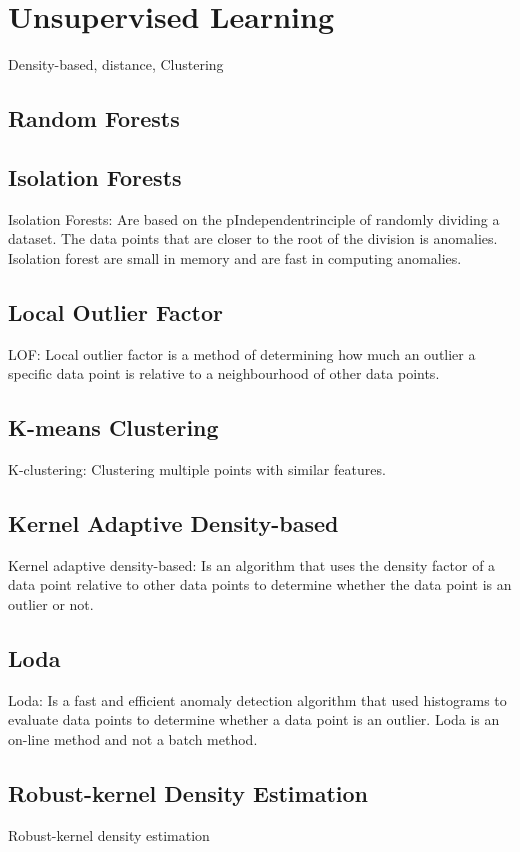 \section{Unsupervised Learning}
Density-based, distance, Clustering

\subsection{Random Forests}

\subsection{Isolation Forests}
Isolation Forests: Are based on the pIndependentrinciple of randomly dividing a dataset. The data points that are closer to the root of the division is anomalies. Isolation forest are small in memory and are fast in computing anomalies.

\subsection{Local Outlier Factor}
LOF: Local outlier factor is a method of determining how much an outlier a specific data point is relative to a neighbourhood of other data points.

\subsection{K-means Clustering}
K-clustering: Clustering multiple points with similar features.

\subsection{Kernel Adaptive Density-based}
Kernel adaptive density-based: Is an algorithm that uses the density factor of a data point relative to other data points to determine whether the data point is an outlier or not.

\subsection{Loda}
Loda: Is a fast and efficient anomaly detection algorithm that used histograms to evaluate data points to determine whether a data point is an outlier. Loda is an on-line method and not a batch method.

\subsection{Robust-kernel Density Estimation}
Robust-kernel density estimation

